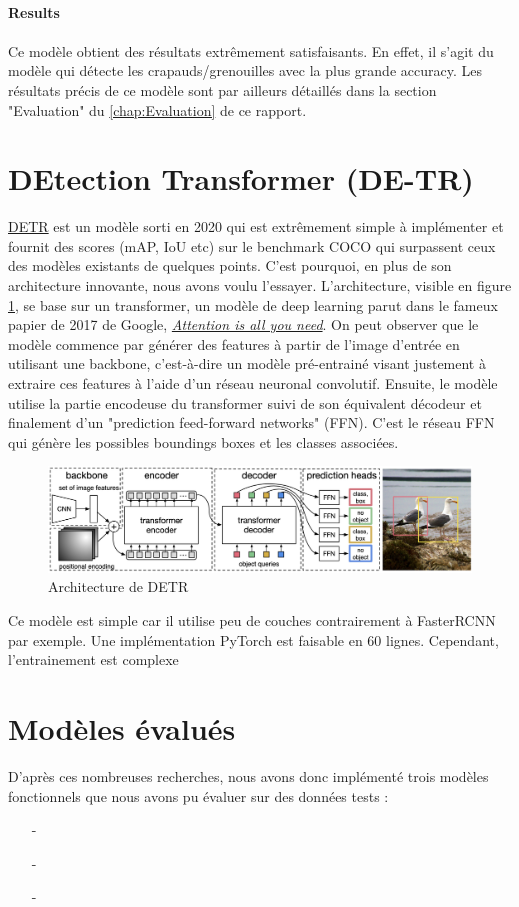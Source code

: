\paragraph{Results}

\paragraph{} Ce modèle obtient des résultats extrêmement satisfaisants. En effet, il s'agit du modèle qui détecte les crapauds/grenouilles avec la plus grande accuracy. Les résultats précis de ce modèle sont par ailleurs détaillés dans la section "Evaluation" du \autoref{chap:Evaluation} de ce rapport.








\section{DEtection Transformer (DE-TR)}

\href{https://github.com/facebookresearch/detr}{DETR} est un modèle sorti en 2020 qui est extrêmement simple à implémenter et fournit des scores (mAP, IoU etc) sur le benchmark COCO qui surpassent ceux des modèles existants de quelques points. C’est pourquoi, en plus de son architecture innovante, nous avons voulu l’essayer. L’architecture, visible en figure \ref{fig:detr_architecture}, se base sur un transformer, un modèle de deep learning parut dans le fameux papier de 2017 de Google, \href{https://arxiv.org/pdf/1706.03762.pdf}{\textit{Attention is all you need}}. On peut observer que le modèle commence par générer des features à partir de l'image d'entrée en utilisant une backbone, c'est-à-dire un modèle pré-entrainé visant justement à extraire ces features à l'aide d'un réseau neuronal convolutif. Ensuite, le modèle utilise la partie encodeuse du transformer suivi de son équivalent décodeur et finalement d'un "prediction feed-forward networks" (FFN). C'est le réseau FFN qui génère les possibles boundings boxes et les classes associées.

\begin{figure}[th!]
    \centering
    \includegraphics[width=\textwidth]{images/detr_architecture.png}
    \caption{Architecture de DETR}
    \label{fig:detr_architecture}
\end{figure}
Ce modèle est simple car il utilise peu de couches contrairement à FasterRCNN par exemple. Une implémentation PyTorch est faisable en 60 lignes. Cependant, l'entrainement est complexe
\section{Modèles évalués}
D'après ces nombreuses recherches, nous avons donc implémenté trois modèles fonctionnels que nous avons pu évaluer sur des données tests : 

\begin{itemize}
    \item[-] 
    \item[-] 
    \item[-] 
\end{itemize}